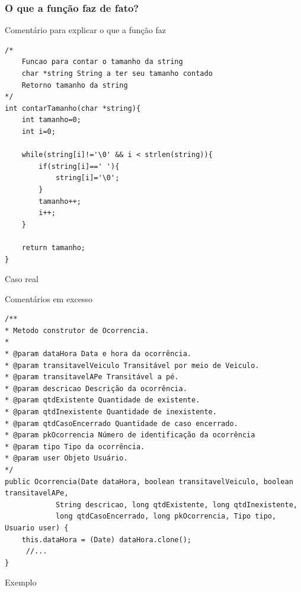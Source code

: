 \begin{frame}[fragile]
	\frametitle{O que a função faz de fato?}

	\begin{listing}[H]
		\caption{Comentário para explicar o que a função faz}
		\begin{verbatim}
/*
	Funcao para contar o tamanho da string
	char *string String a ter seu tamanho contado
	Retorno tamanho da string
*/
int contarTamanho(char *string){
	int tamanho=0;
	int i=0;

	while(string[i]!='\0' && i < strlen(string)){
		if(string[i]==' '){
			string[i]='\0';
		}
		tamanho++;
		i++;
	}

	return tamanho;
}
		\end{verbatim}
	\end{listing}

\end{frame}

\begin{frame}
	\Huge Caso real
\end{frame}

\begin{frame}[fragile]

	\begin{listing}[H]
		\caption{Comentários em excesso}
		\begin{verbatim}
/**
* Metodo construtor de Ocorrencia.
*
* @param dataHora Data e hora da ocorrência.
* @param transitavelVeiculo Transitável por meio de Veiculo.
* @param transitavelAPe Transitável a pé.
* @param descricao Descrição da ocorrência.
* @param qtdExistente Quantidade de existente.
* @param qtdInexistente Quantidade de inexistente.
* @param qtdCasoEncerrado Quantidade de caso encerrado.
* @param pkOcorrencia Número de identificação da ocorrência
* @param tipo Tipo da ocorrência.
* @param user Objeto Usuário.
*/
public Ocorrencia(Date dataHora, boolean transitavelVeiculo, boolean transitavelAPe,
			String descricao, long qtdExistente, long qtdInexistente,
			long qtdCasoEncerrado, long pkOcorrencia, Tipo tipo, Usuario user) {
	this.dataHora = (Date) dataHora.clone();
 	 //...
}
		\end{verbatim}
	\end{listing}

\end{frame}

\begin{frame}
	\Huge Exemplo
\end{frame}

